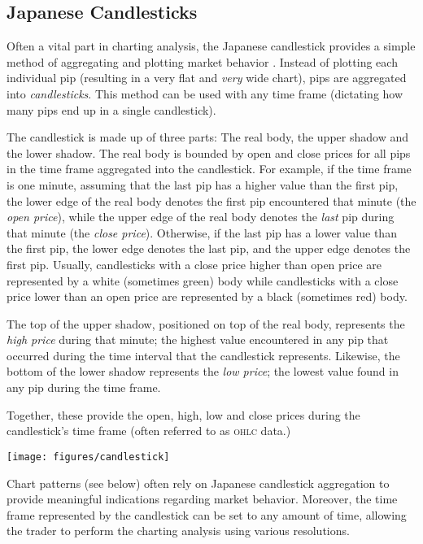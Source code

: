 \begin{multicols}{2}
\subsection{Japanese Candlesticks}

Often a vital part in charting analysis, the Japanese candlestick provides a
simple method of aggregating and plotting market behavior \citep{nison2001}.
Instead of plotting each individual pip (resulting in a very flat and
\textit{very} wide chart), pips are aggregated into \textit{candlesticks}.  This
method can be used with any time frame (dictating how many pips end up in a
single candlestick).

The candlestick is made up of three parts: The real body, the upper shadow and
the lower shadow.  The real body is bounded by open and close prices for all
pips in the time frame aggregated into the candlestick.  For example, if the
time frame is one minute, assuming that the last pip has a higher value than the
first pip, the lower edge of the real body denotes the first pip encountered
that minute (the \textit{open price}), while the upper edge of the real body
denotes the \textit{last} pip during that minute (the \textit{close price}).
Otherwise, if the last pip has a lower value than the first pip, the lower edge
denotes the last pip, and the upper edge denotes the first pip. Usually,
candlesticks with a close price higher than open price are represented by a
white (sometimes green) body while candlesticks with a close price lower than an
open price are represented by a black (sometimes red) body.

The top of the upper shadow, positioned on top of the real body, represents the
\textit{high price} during that minute; the highest value encountered in any pip
that occurred during the time interval that the candlestick represents.
Likewise, the bottom of the lower shadow represents the \textit{low price}; the
lowest value found in any pip during the time frame.

Together, these provide the open, high, low and close prices during the
candlestick's time frame (often referred to as \textsc{ohlc} data.)

\begin{Figure}
  \texttt{[image: figures/candlestick]}
\end{Figure}

\noindent Chart patterns (see below) often rely on Japanese candlestick
aggregation to provide meaningful indications regarding market behavior.
Moreover, the time frame represented by the candlestick can be set to any amount
of time, allowing the trader to perform the charting analysis using various
resolutions.


\end{multicols}

